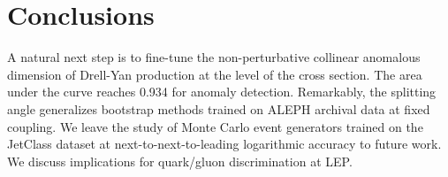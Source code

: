 \section{Conclusions}\label{sec:conclusions}

A natural next step is to fine-tune the non-perturbative collinear
anomalous dimension of Drell-Yan production at the level of the cross
section. The area under the curve reaches 0.934 for anomaly detection.
Remarkably, the splitting angle generalizes bootstrap methods trained on
ALEPH archival data at fixed coupling. We leave the study of Monte Carlo
event generators trained on the JetClass dataset at
next-to-next-to-leading logarithmic accuracy to future work. We discuss
implications for quark/gluon discrimination at LEP.

